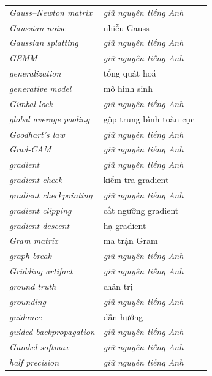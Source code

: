 \documentclass[deep_learning.tex]{subfiles}
\begin{document}
\begin{longtable}{@{}L{5.2cm}L{5.9cm}L{2.6cm}@{}}
\emph{Gauss--Newton matrix} & \emph{\color{tiercol}giữ nguyên tiếng Anh} & \\
\emph{Gaussian noise} & nhiễu Gauss & \\
\emph{Gaussian splatting} & \emph{\color{tiercol}giữ nguyên tiếng Anh} & \\
\emph{GEMM} & \emph{\color{tiercol}giữ nguyên tiếng Anh} & \\
\emph{generalization} & tổng quát hoá & \\
\emph{generative model} & mô hình sinh & \\
\emph{Gimbal lock} & \emph{\color{tiercol}giữ nguyên tiếng Anh} & \\
\emph{global average pooling} & gộp trung bình toàn cục & \\
\emph{Goodhart's law} & \emph{\color{tiercol}giữ nguyên tiếng Anh} & \\
\emph{Grad-CAM} & \emph{\color{tiercol}giữ nguyên tiếng Anh} & \\
\emph{gradient} & \emph{\color{tiercol}giữ nguyên tiếng Anh} & \\
\emph{gradient check} & kiểm tra gradient & \\
\emph{gradient checkpointing} & \emph{\color{tiercol}giữ nguyên tiếng Anh} & \\
\emph{gradient clipping} & cắt ngưỡng gradient & \\
\emph{gradient descent} & hạ gradient & \\
\emph{Gram matrix} & ma trận Gram & \\
\emph{graph break} & \emph{\color{tiercol}giữ nguyên tiếng Anh} & \\
\emph{Gridding artifact} & \emph{\color{tiercol}giữ nguyên tiếng Anh} & \\
\emph{ground truth} & chân trị & \\
\emph{grounding} & \emph{\color{tiercol}giữ nguyên tiếng Anh} & \\
\emph{guidance} & dẫn hướng & \\
\emph{guided backpropagation} & \emph{\color{tiercol}giữ nguyên tiếng Anh} & \\
\emph{Gumbel-softmax} & \emph{\color{tiercol}giữ nguyên tiếng Anh} & \\
\emph{half precision} & \emph{\color{tiercol}giữ nguyên tiếng Anh} & \\

\end{longtable}
\end{document}

